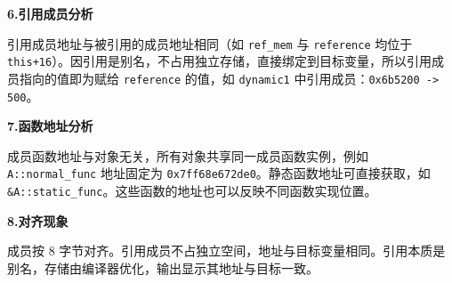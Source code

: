 \documentclass{article}
\begin{document}
\textbf{6.引用成员分析}

引用成员地址与被引用的成员地址相同（如 \texttt{ref\_mem} 与 \texttt{reference} 均位于 \texttt{this+16}）。因引用是别名，不占用独立存储，直接绑定到目标变量，所以引用成员指向的值即为赋给 \texttt{reference} 的值，如 \texttt{dynamic1} 中引用成员：\texttt{0x6b5200 -> 500}。

\textbf{7.函数地址分析}

成员函数地址与对象无关，所有对象共享同一成员函数实例，例如 \texttt{A::normal\_func} 地址固定为 \texttt{0x7ff68e672de0}。静态函数地址可直接获取，如 \texttt{\&A::static\_func}。这些函数的地址也可以反映不同函数实现位置。

\textbf{8.对齐现象}

成员按 8 字节对齐。引用成员不占独立空间，地址与目标变量相同。引用本质是别名，存储由编译器优化，输出显示其地址与目标一致。
\end{document}
